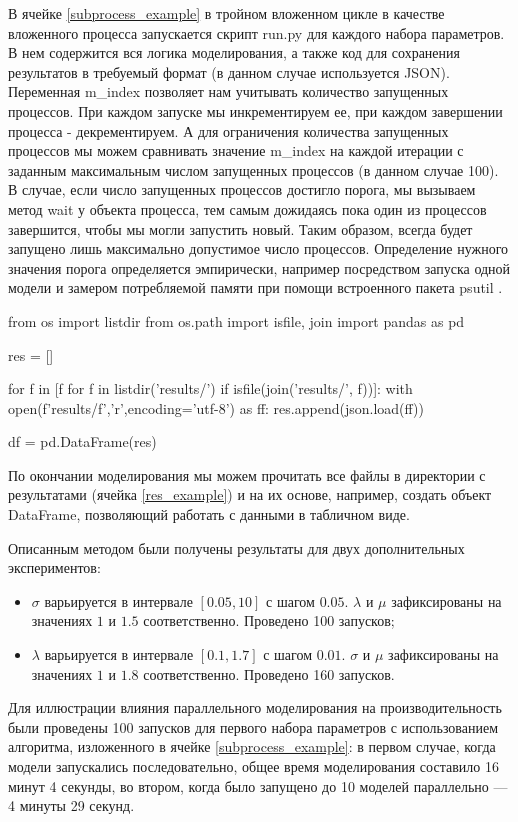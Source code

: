 В ячейке \ref{subprocess_example} в тройном вложенном цикле в качестве вложенного процесса запускается скрипт run.py для каждого набора параметров. В нем содержится вся логика моделирования, а также код для сохранения результатов в требуемый формат (в данном случае используется JSON). Переменная m\_index позволяет нам учитывать количество запущенных процессов. При каждом запуске мы инкрементируем ее, при каждом завершении процесса - декрементируем. А для ограничения количества запущенных процессов мы можем сравнивать значение m\_index на каждой итерации с заданным максимальным числом запущенных процессов (в данном случае 100). В случае, если число запущенных процессов достигло порога, мы вызываем метод wait у объекта процесса, тем самым дожидаясь пока один из процессов завершится, чтобы мы могли запустить новый. Таким образом, всегда будет запущено лишь максимально допустимое число процессов. Определение нужного значения порога определяется эмпирически, например посредством запуска одной модели и замером потребляемой памяти при помощи встроенного пакета psutil \cite{psutil}.


\begin{pyin}  
from os import listdir
from os.path import isfile, join
import pandas as pd

res = []

for f in [f for f in listdir('results/') if isfile(join('results/', f))]:
   with open(f'results/{f}','r',encoding='utf-8') as ff:
   res.append(json.load(ff))

df = pd.DataFrame(res)
\end{pyin}

По окончании моделирования мы можем прочитать все файлы в директории с результатами (ячейка \ref{res_example}) и на их основе, например, создать объект DataFrame, позволяющий работать с данными в табличном виде.

Описанным методом были получены результаты для двух дополнительных экспериментов:
\begin{itemize}
	\item $\sigma$ варьируется в интервале $[0.05,10]$ с шагом $0.05$. $\lambda$ и $\mu$ зафиксированы на значениях $1$ и $1.5$ соответственно. Проведено 100 запусков;
	\item $\lambda$ варьируется в интервале $[0.1,1.7]$ с шагом $0.01$. $\sigma$ и $\mu$ зафиксированы на значениях $1$ и $1.8$ соответственно. Проведено 160 запусков.
\end{itemize}

Для иллюстрации влияния параллельного моделирования на производительность были проведены 100 запусков для первого набора параметров с использованием алгоритма, изложенного в ячейке \ref{subprocess_example}: в первом случае, когда модели запускались последовательно, общее время моделирования составило 16 минут 4 секунды, во втором, когда было запущено до 10 моделей параллельно --- 4 минуты 29 секунд. 

